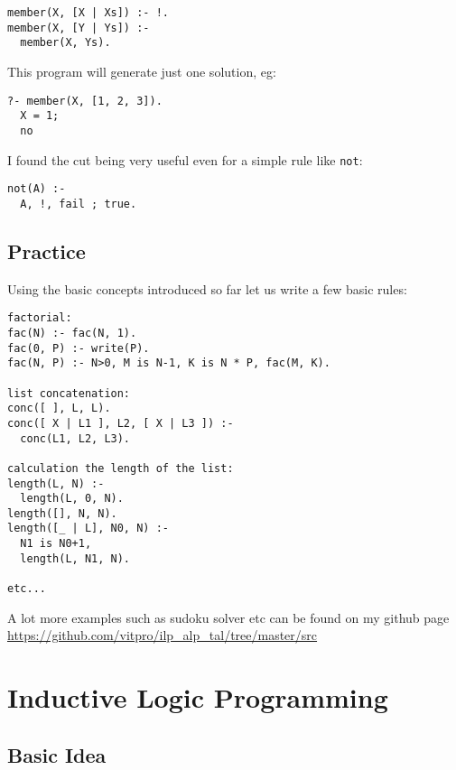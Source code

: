 \documentclass[11pt]{article}
\begin{document}
\begin{lstlisting}
member(X, [X | Xs]) :- !.
member(X, [Y | Ys]) :-
  member(X, Ys).
\end{lstlisting}
This program will generate just one solution, eg:
\begin{lstlisting}
?- member(X, [1, 2, 3]).
  X = 1;
  no
\end{lstlisting}
I found the cut being very useful even for a simple rule like \texttt{not}:
\begin{lstlisting}
not(A) :-
  A, !, fail ; true.
\end{lstlisting}


\subsection{Practice}
Using the basic concepts introduced so far let us write a few basic rules:
\begin{lstlisting}
factorial:
fac(N) :- fac(N, 1).
fac(0, P) :- write(P).
fac(N, P) :- N>0, M is N-1, K is N * P, fac(M, K).

list concatenation:
conc([ ], L, L).
conc([ X | L1 ], L2, [ X | L3 ]) :- 
  conc(L1, L2, L3).

calculation the length of the list:
length(L, N) :-
  length(L, 0, N).
length([], N, N).
length([_ | L], N0, N) :-
  N1 is N0+1,
  length(L, N1, N).

etc...
\end{lstlisting}
A lot more examples such as sudoku solver etc can be found on my github page \url{https://github.com/vitpro/ilp_alp_tal/tree/master/src}


\section{Inductive Logic Programming}

\subsection{Basic Idea}
\end{document}
